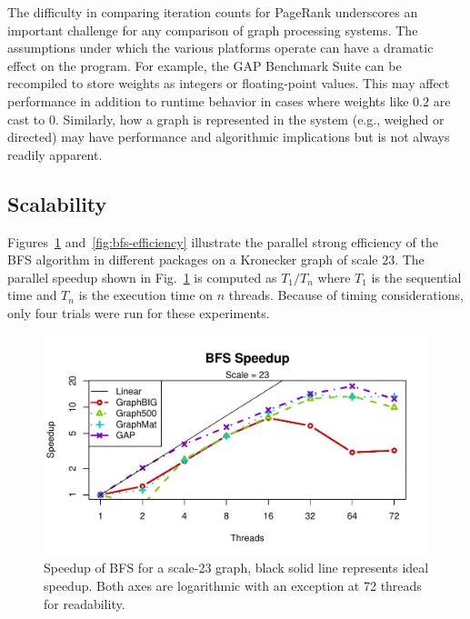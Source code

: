 \documentclass[conference]{IEEEtran}
\begin{document}
The difficulty in comparing iteration counts for PageRank underscores an important challenge for any comparison of graph processing systems. The assumptions under which the various platforms operate can have a dramatic effect on the program. For example, the GAP Benchmark Suite can be recompiled to store weights as integers or floating-point values. This may affect performance in addition to runtime behavior in cases where weights like $0.2$ are cast to $0$. Similarly, how a graph is represented in the system (e.g., weighed or directed) may have performance and algorithmic implications but is not always readily apparent.

\subsection{Scalability}
Figures~\ref{fig:bfs-speedup} and~\ref{fig:bfs-efficiency} illustrate the parallel strong efficiency of the BFS algorithm in different packages on a Kronecker graph of scale $23$. The parallel speedup shown in Fig.~\ref{fig:bfs-speedup} is computed as $T_1 / T_n$ where $T_1$ is the sequential time and $T_n$ is the execution time on $n$ threads. Because of timing considerations, only four trials were run for these experiments.
\begin{figure}[htb]
	\centering
		\includegraphics[width=\linewidth, trim=0 18pt 18pt 12pt, clip]{graphics/bfs_speedup23.pdf}
		\caption{Speedup of BFS for a scale-23 graph, black solid line represents ideal speedup. Both axes are logarithmic with an exception at 72 threads for readability. }
	\label{fig:bfs-speedup}
\end{figure}
\end{document}
